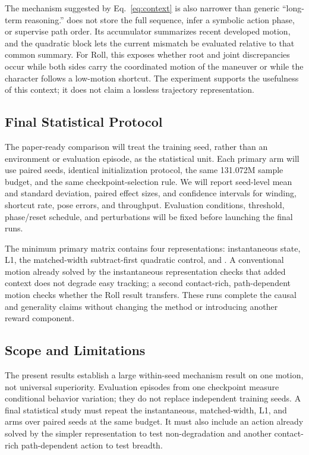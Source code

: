 The mechanism suggested by Eq.~\eqref{eq:context} is also narrower than generic
``long-term reasoning.''  \method{} does not store the full sequence, infer a
symbolic action phase, or supervise path order.  Its accumulator summarizes
recent developed motion, and the quadratic block lets the current mismatch be
evaluated relative to that common summary.  For Roll, this exposes whether
root and joint discrepancies occur while both sides carry the coordinated
motion of the maneuver or while the character follows a low-motion shortcut.
The experiment supports the usefulness of this context; it does not claim a
lossless trajectory representation.

\subsection{Final Statistical Protocol}

The paper-ready comparison will treat the training seed, rather than an
environment or evaluation episode, as the statistical unit.  Each primary arm
will use paired seeds, identical initialization protocol, the same 131.072M
sample budget, and the same checkpoint-selection rule.  We will report
seed-level mean and standard deviation, paired effect sizes, and confidence
intervals for winding, shortcut rate, pose errors, and throughput.  Evaluation
conditions, threshold, phase/reset schedule, and perturbations will be fixed
before launching the final runs.

The minimum primary matrix contains four representations: instantaneous state,
L1, the matched-width subtract-first quadratic control, and \method{}.  A
conventional motion already solved by the instantaneous representation checks
that added context does not degrade easy tracking; a second contact-rich,
path-dependent motion checks whether the Roll result transfers.  These runs
complete the causal and generality claims without changing the method or
introducing another reward component.

\subsection{Scope and Limitations}

The present results establish a large within-seed mechanism result on one
motion, not universal superiority.  Evaluation episodes from one checkpoint
measure conditional behavior variation; they do not replace independent
training seeds.  A final statistical study must repeat the instantaneous,
matched-width, L1, and \method{} arms over paired seeds at the same budget.  It
must also include an action already solved by the simpler representation to
test non-degradation and another contact-rich path-dependent action to test
breadth.


